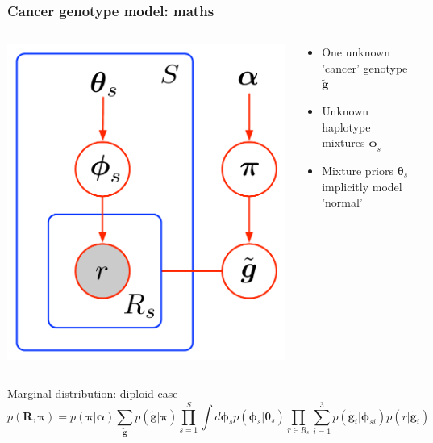 \documentclass{beamer}
\begin{document}
\begin{frame}[fragile] %
\frametitle{Cancer genotype model: maths}

\begin{columns}[c]

\begin{column}{.35\textwidth}
    \includegraphics[width=\linewidth]{images/cancer_model}
\end{column}

\begin{column}{.65\textwidth}
\begin{itemize}
\item One unknown 'cancer' genotype $\tilde{\boldsymbol{g}}$
\item Unknown haplotype mixtures $\boldsymbol{\phi}_s$
\item Mixture priors $\boldsymbol{\theta}_s$ implicitly model 'normal'
\end{itemize}
\end{column}
\end{columns}

\begin{exampleblock}{Marginal distribution: diploid case}
\setlength\abovedisplayskip{0pt}
\begin{equation*}
p(\boldsymbol{R}, \boldsymbol{\pi}) = p(\boldsymbol{\pi} | \boldsymbol{\alpha}) \sum_{\tilde{\boldsymbol{g}}} p(\tilde{\boldsymbol{g}} | \boldsymbol{\pi}) \prod_{s=1}^S \int d \boldsymbol{\phi}_s   p(\boldsymbol{\phi}_s | \boldsymbol{\theta}_s) \prod_{r \in R_s} \sum_{i = 1}^3 p(\tilde{\boldsymbol{g}}_i | \boldsymbol{\phi}_{si}) p(r | \tilde{\boldsymbol{g}}_i)
\end{equation*}
\end{exampleblock}


\end{frame}
\end{document}
